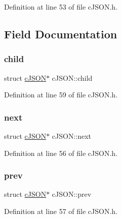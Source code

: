 Definition at line 53 of file c\+J\+S\+O\+N.\+h.



\subsection{Field Documentation}
\mbox{\label{structc_j_s_o_n_a401b274c2da358dac5c23ab8b2c71f85}} 
\subsubsection{\texorpdfstring{child}{child}}
{\footnotesize\ttfamily struct \hyperlink{structc_j_s_o_n}{c\+J\+S\+ON}$\ast$ c\+J\+S\+O\+N\+::child}



Definition at line 59 of file c\+J\+S\+O\+N.\+h.

\mbox{\label{structc_j_s_o_n_ade862b880379b5e2a591f7326401fa8d}} 
\subsubsection{\texorpdfstring{next}{next}}
{\footnotesize\ttfamily struct \hyperlink{structc_j_s_o_n}{c\+J\+S\+ON}$\ast$ c\+J\+S\+O\+N\+::next}



Definition at line 56 of file c\+J\+S\+O\+N.\+h.

\mbox{\label{structc_j_s_o_n_a488a393f610347821fce8e985e79fc2f}} 
\subsubsection{\texorpdfstring{prev}{prev}}
{\footnotesize\ttfamily struct \hyperlink{structc_j_s_o_n}{c\+J\+S\+ON}$\ast$ c\+J\+S\+O\+N\+::prev}



Definition at line 57 of file c\+J\+S\+O\+N.\+h.

\mbox{\label{structc_j_s_o_n_aa6b47e9a4b0e0a26f519b1a2b6739983}} 
